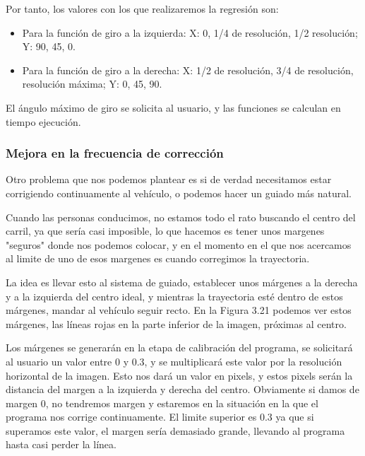 
Por tanto, los valores con los que realizaremos la regresión son:

\begin{itemize}

	\item Para la función de giro a la izquierda: X: 0, 1/4 de resolución, 1/2 resolución; Y: 90, 45, 0.
	
	\item Para la función de giro a la derecha: X: 1/2 de resolución, 3/4 de resolución, resolución máxima; Y: 0, 45, 90.
\end{itemize}

El ángulo máximo de giro se solicita al usuario, y las funciones se calculan en tiempo ejecución.

\subsubsection{Mejora en la frecuencia de corrección}
Otro problema que nos podemos plantear es si de verdad necesitamos estar corrigiendo continuamente al vehículo, o podemos hacer un guiado más natural.

Cuando las personas conducimos, no estamos todo el rato buscando el centro del carril, ya que sería casi imposible, lo que hacemos es tener unos margenes "seguros" donde nos podemos colocar, y en el momento en el que nos acercamos al limite de uno de esos margenes es cuando corregimos la trayectoria.

La idea es llevar esto al sistema de guiado, establecer unos márgenes a la derecha y a la izquierda del centro ideal, y mientras la trayectoria esté dentro de estos márgenes, mandar al vehículo seguir recto. En la Figura 3.21 podemos ver estos márgenes, las líneas rojas en la parte inferior de la imagen, próximas al centro.

Los márgenes se generarán en la etapa de calibración del programa, se solicitará al usuario un valor entre 0 y 0.3, y se multiplicará este valor por la resolución horizontal de la imagen. Esto nos dará un valor en pixels, y estos pixels serán la distancia del margen a la izquierda y derecha del centro. Obviamente si damos de margen 0, no tendremos margen y estaremos en la situación en la que el programa nos corrige continuamente. El limite superior es 0.3 ya que si superamos este valor, el margen sería demasiado grande, llevando al programa hasta casi perder la línea. 

